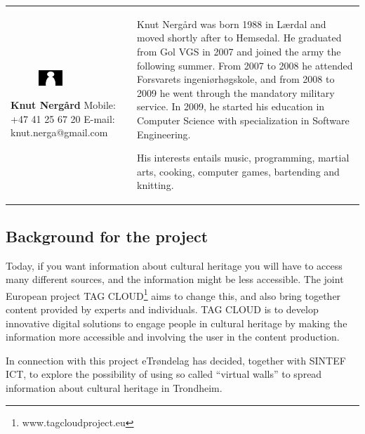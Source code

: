 \documentclass[11pt]{book}
\begin{document}
\begin{table}[H]
\centering
\begin{tabular}{ p{7cm} p{7cm} }
\parbox{7cm}{
\begin{figure}[H]
      \includegraphics[width=0.4\textwidth]{Figures/Person.png}
      \label{fig:partners_group_knut}
\end{figure}
\textbf{Knut Nergård}\\
Mobile: +47 41 25 67 20\\
E-mail: knut.nerga@gmail.com} & \parbox{7cm}{
Knut Nergård was born 1988 in Lærdal and moved shortly after to Hemsedal. He graduated from Gol VGS in 2007 and joined the army the following summer. From 2007 to 2008 he attended Forsvarets ingeniørhøgskole, and from 2008 to 2009 he went through the mandatory military service. In 2009, he started his education in Computer Science with specialization in Software Engineering. 

His interests entails music, programming, martial arts, cooking, computer games, bartending and knitting.
}
\end{tabular}
\label{tab:partners_group_knut}
\end{table}


\subsection{Background for the project}
Today, if you want information about cultural heritage you will have to access many different sources, and the information might be less accessible. The joint European project TAG CLOUD\footnote{www.tagcloudproject.eu} aims to change this, and also bring together content provided by experts and individuals. TAG CLOUD is to develop innovative digital solutions to engage people in cultural heritage by making the information more accessible and involving the user in the content production.

In connection with this project eTrøndelag has decided, together with SINTEF ICT, to explore the possibility of using so called ``virtual walls'' to spread information about cultural heritage in Trondheim.
\end{document}
